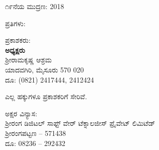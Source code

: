 \thispagestyle{empty}

\vfill

\begin{flushleft}
೧೯ನೆಯ ಮುದ್ರಣ: 2018
\end{flushleft}

\vfill

\begin{flushleft}
ಪ್ರತಿಗಳು: 
\end{flushleft}

\vfill


\vfill

\begin{flushleft}
ಪ್ರಕಾಶಕರು:\\\textbf{ಅಧ್ಯಕ್ಷರು}\\ಶ‍್ರೀರಾಮಕೃಷ್ಣ ಆಶ್ರಮ\\ಯಾದವಗಿರಿ, ಮೈಸೂರು 570 020\\ದೂ: (0821) 2417444, 2412424
\end{flushleft}

\vfill

\begin{flushleft}
 ಎಲ್ಲ ಹಕ್ಕುಗಳೂ ಪ್ರಕಾಶಕರಿಗೆ ಸೇರಿವೆ. 
\end{flushleft}

\vfill

\begin{flushleft}{\small
ಅಕ್ಷರ ವಿನ್ಯಾಸ:\\ಶ‍್ರೀರಂಗ ಡಿಜಿಟಲ್ ಸಾಫ್ಟ್ ‍ವೇರ್ ಟೆಕ್ನಾಲಜೀಸ್ ಪ್ರೈವೇಟ್ ಲಿಮಿಟೆಡ್\\ಶ‍್ರೀರಂಗಪಟ್ಟಣ – 571438\\ದೂ: 08236 – 292432
}\end{flushleft}

\vfill


